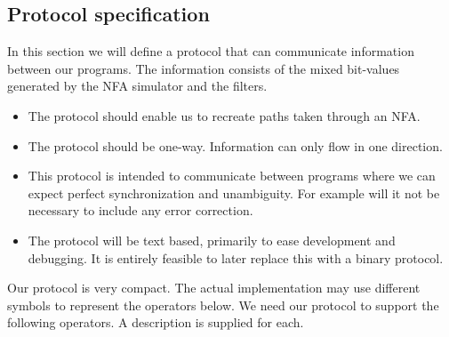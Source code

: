  

\subsection{Protocol specification}
\label{sec:protocol_spec}


In this section we will define a protocol that can communicate
information between our programs. The information consists of the
mixed bit-values generated by the NFA simulator and the filters.

\begin{itemize}
\item The protocol should enable us to recreate paths taken through an
  NFA.
\item The protocol should be one-way. Information can only flow in one
  direction.
\item This protocol is intended to communicate between programs where
  we can expect perfect synchronization and unambiguity. For example
  will it not be necessary to include any error correction. 
\item The protocol will be text based, primarily to ease development
  and debugging. It is entirely feasible to later replace this with a
  binary protocol.
\end{itemize}

Our protocol is very compact. The actual implementation may use
different symbols to represent the operators below. We need our
protocol to support the following operators. A description is supplied
for each.

